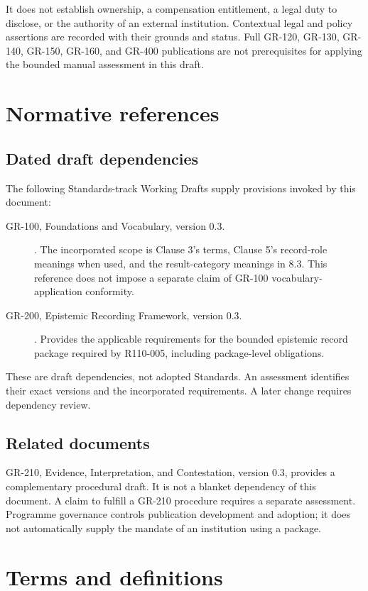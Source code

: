 \documentclass[11pt,a4paper]{article}
\begin{document}
It does not establish ownership, a compensation entitlement, a legal duty to disclose, or the authority of an external institution. Contextual legal and policy assertions are recorded with their grounds and status. Full GR-120, GR-130, GR-140, GR-150, GR-160, and GR-400 publications are not prerequisites for applying the bounded manual assessment in this draft.

\section{Normative references}
\subsection{Dated draft dependencies}
The following Standards-track Working Drafts supply provisions invoked by this document:
\begin{description}
\item[GR-100, Foundations and Vocabulary, version 0.3.] . The incorporated scope is Clause 3's terms, Clause 5's record-role meanings when used, and the result-category meanings in 8.3. This reference does not impose a separate claim of GR-100 vocabulary-application conformity.
\item[GR-200, Epistemic Recording Framework, version 0.3.] . Provides the applicable requirements for the bounded epistemic record package required by R110-005, including package-level obligations.
\end{description}
These are draft dependencies, not adopted Standards. An assessment identifies their exact versions and the incorporated requirements. A later change requires dependency review.

\subsection{Related documents}
GR-210, Evidence, Interpretation, and Contestation, version 0.3, provides a complementary procedural draft. It is not a blanket dependency of this document. A claim to fulfill a GR-210 procedure requires a separate assessment. Programme governance controls publication development and adoption; it does not automatically supply the mandate of an institution using a package.

\section{Terms and definitions}
\end{document}
